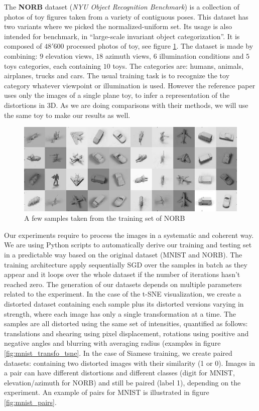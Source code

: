 \documentclass[a4paper,12pt]{report}
\begin{document}
The {\bf NORB} dataset ({\em NYU Object Recognition Benchmark}) is a collection of photos of toy figures taken from a variety of contiguous poses.
This dataset has two variants where we picked the normalized-uniform set.
Its usage is also intended for benchmark, in ``large-scale invariant object categorization''.
It is composed of $48'600$ processed photos of toy, see figure \ref{fig:norb}.
The dataset is made by combining: $9$ elevation views, $18$ azimuth views, $6$ illumination conditions and $5$ toys categories, each containing $10$ toys.
The categories are: humans, animals, airplanes, trucks and cars.
The usual training task is to recognize the toy category whatever viewpoint or illumination is used.
However the reference paper uses only the images of a single plane toy, to infer a representation of the distortions in 3D.
As we are doing comparisons with their methods, we will use the same toy to make our results as well.

\begin{figure}[h]
    \begin{center}
        \includegraphics{thesis_figures/norb.jpg}
    \end{center}
    \caption{A few samples taken from the training set of NORB}
    \label{fig:norb}
\end{figure}

Our experiments require to process the images in a systematic and coherent way.
We are using Python scripts to automatically derive our training and testing set in a predictable way based on the original dataset (MNIST and NORB).
The training architecture apply sequentially SGD over the samples in batch as they appear and it loops over the whole dataset if the number of iterations hasn't reached zero.
The generation of our datasets depends on multiple parameters related to the experiment.
In the case of the t-SNE visualization, we create a distorted dataset containing each sample plus its distorted versions varying in strength, where each image has only a single transformation at a time.
The samples are all distorted using the same set of intensities, quantified as follows: translations and shearing using pixel displacement, rotations using positive and negative angles and blurring with averaging radius (examples in figure \ref{fig:mnist_transfo_tsne}.
In the case of Siamese training, we create paired datasets: containing two distorted images with their similarity (1 or 0).
Images in a pair can have different distortions and different classes (digit for MNIST, elevation/azimuth for NORB) and still be paired (label 1), depending on the experiment.
An example of pairs for MNIST is illustrated in figure \ref{fig:mnist_pairs}.
\end{document}
